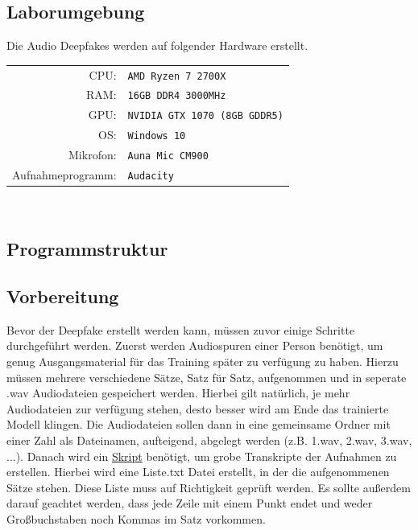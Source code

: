 \subsection{Laborumgebung}
Die Audio Deepfakes werden auf folgender Hardware erstellt.\\[0.5cm]
\begin{tabular}{rl}
    CPU:& \texttt{AMD Ryzen 7 2700X}\\
    RAM:& \texttt{16GB DDR4 3000MHz}\\
    GPU:& \texttt{NVIDIA GTX 1070 (8GB GDDR5)}\\
    OS:& \texttt{Windows 10}\\
    Mikrofon:& \texttt{Auna Mic CM900}\\
    Aufnahmeprogramm:& \texttt{Audacity}
\end{tabular}\\[0.5cm]
\subsection{Programmstruktur}
\subsection{Vorbereitung}
Bevor der Deepfake erstellt werden kann, müssen zuvor einige Schritte durchgeführt werden. Zuerst werden Audiospuren einer Person benötigt, um genug Ausgangsmaterial für das Training später zu verfügung zu haben. Hierzu müssen mehrere verschiedene Sätze, Satz für Satz, aufgenommen und in seperate .wav Audiodateien gespeichert werden. Hierbei gilt natürlich, je mehr Audiodateien zur verfügung stehen, desto besser wird am Ende das trainierte Modell klingen. Die Audiodateien sollen dann in eine gemeinsame Ordner mit einer Zahl als Dateinamen, aufteigend, abgelegt werden (z.B. 1.wav, 2.wav, 3.wav, ...).\newline
Danach wird ein \href{https://github.com/rasmurtech/Tacotron2-Wav2Vec-Transcription/blob/main/transcribe_wav2vec.py}{Skript} benötigt, um grobe Transkripte der Aufnahmen zu erstellen. Hierbei wird eine Liste.txt Datei erstellt, in der die aufgenommenen Sätze stehen. Diese Liste muss auf Richtigkeit geprüft werden. Es sollte außerdem darauf geachtet werden, dass jede Zeile mit einem Punkt endet und weder Großbuchstaben noch Kommas im Satz vorkommen.\newline
